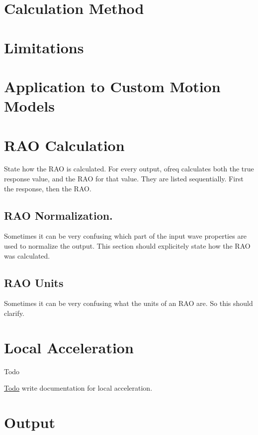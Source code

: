 \section*{Calculation Method}

\section*{Limitations}

\section*{Application to Custom Motion Models}

\section*{R\-A\-O Calculation}

State how the R\-A\-O is calculated. For every output, ofreq calculates both the true response value, and the R\-A\-O for that value. They are listed sequentially. First the response, then the R\-A\-O.

\subsection*{R\-A\-O Normalization.}

Sometimes it can be very confusing which part of the input wave properties are used to normalize the output. This section should explicitely state how the R\-A\-O was calculated.

\subsection*{R\-A\-O Units}

Sometimes it can be very confusing what the units of an R\-A\-O are. So this should clarify. \hypertarget{local_acceleration}{}\section{Local Acceleration}\label{local_acceleration}
\begin{DoxyRefDesc}{Todo}
\item[\hyperlink{todo__todo000017}{Todo}]write documentation for local acceleration.\end{DoxyRefDesc}


\section*{Output}


